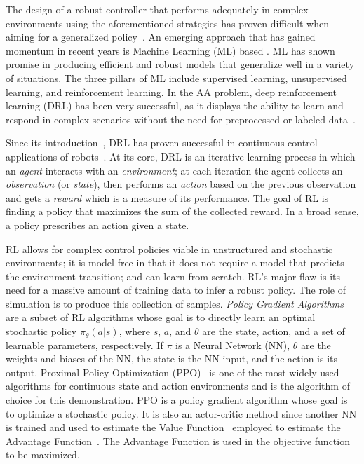 \documentclass[12pt,twocolumn]{article}
\begin{document}
The design of a robust controller that performs adequately in complex environments using the aforementioned strategies has proven difficult when aiming for a generalized policy~\cite{Kuutti2019ASO}. An emerging approach that has gained momentum in recent years is Machine Learning (ML) based \cite{surveyRLrobotics2013}. ML has shown promise in producing efficient and robust models that generalize well in a variety of situations. The three pillars of ML include supervised learning, unsupervised learning, and reinforcement learning. In the AA problem, deep reinforcement learning (DRL) has been very successful, as it displays the ability to learn and respond in complex scenarios without the need for preprocessed or labeled data~\cite{VirtualToRealRL}.

Since its introduction~\cite{Mnih13}, DRL has proven successful in continuous control applications of robots~\cite{Levine2016,inHandManipulation2020}. At its core, DRL is an iterative learning process in which an \emph{agent} interacts with an \emph{environment}; at each iteration the agent collects an \emph{observation} (or \emph{state}), then performs an \emph{action} based on the previous observation and gets a \emph{reward} which is a measure of its performance. The goal of RL is finding a policy that maximizes the sum of the collected reward. In a broad sense, a policy prescribes an action given a state.

RL allows for complex control policies viable in unstructured and stochastic environments; it is model-free in that it does not require a model that predicts the environment transition; and can learn from scratch. RL's major flaw is its need for a massive amount of training data to infer a robust policy. The role of simulation is to produce this collection of samples. \emph{Policy Gradient Algorithms} are a subset of RL algorithms whose goal is to directly learn an optimal stochastic policy $\pi_\theta(a|s)$, where $s$, $a$, and $\theta$ are the state, action, and a set of learnable parameters, respectively. If $\pi$ is a Neural Network (NN), $\theta$ are the weights and biases of the NN, the state is the NN input, and the action is its output. Proximal Policy Optimization (PPO)~\cite{Schulman2017PPO} is one of the most widely used algorithms for continuous state and action environments and is the algorithm of choice for this demonstration. PPO is a policy gradient algorithm whose goal is to optimize a stochastic policy. It is also an actor-critic method since another NN is trained and used to estimate the Value Function~\cite{SuttonBarto1998RL} employed to estimate the Advantage Function~\cite{Kakade02approximatelyoptimal}. The Advantage Function is used in the objective function to be maximized.
\end{document}
